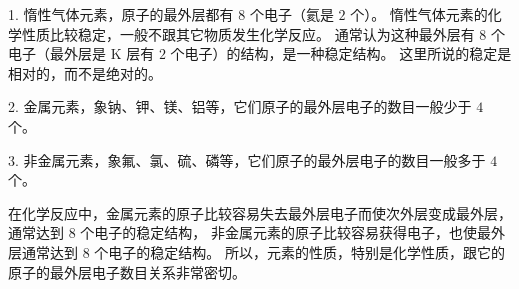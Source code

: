 1. 惰性气体元素，原子的最外层都有 $8$ 个电子（氦是 $2$ 个）。
惰性气体元素的化学性质比较稳定，一般不跟其它物质发生化学反应。
通常认为这种最外层有 $8$ 个电子（最外层是 K 层有 $2$ 个电子）的结构，是一种稳定结构。
这里所说的稳定是相对的，而不是绝对的。

2. 金属元素，象钠、钾、镁、铝等，它们原子的最外层电子的数目一般少于 $4$ 个。

3. 非金属元素，象氟、氯、硫、磷等，它们原子的最外层电子的数目一般多于 $4$ 个。

在化学反应中，金属元素的原子比较容易失去最外层电子而使次外层变成最外层，通常达到 $8$ 个电子的稳定结构，
非金属元素的原子比较容易获得电子，也使最外层通常达到 $8$ 个电子的稳定结构。
所以，元素的性质，特别是化学性质，跟它的原子的最外层电子数目关系非常密切。


\begin{xiti}




\end{xiti}


